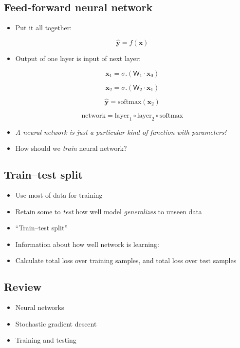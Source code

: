\hypertarget{feed-forward-neural-network}{%
\subsection{Feed-forward neural
network}\label{feed-forward-neural-network}}

\begin{itemize}
\item
  Put it all together:

  \[\hat{\mathbf{y}} = f(\mathbf{x})\]
\item
  Output of one layer is input of next layer:

  \[\mathbf{x}_1 = \sigma.(\mathsf{W}_1 \cdot \mathbf{x}_0)\]

  \[\mathbf{x}_2 = \sigma.(\mathsf{W}_2 \cdot \mathbf{x}_1)\]

  \[\hat{\mathbf{y}} = \text{softmax}(\mathbf{x}_2)\]

  \[\text{network} = \text{layer}_1 \circ \text{layer}_2 \circ \text{softmax} \]
\item
  \emph{A neural network is just a particular kind of function with
  parameters!}
\item
  How should we \emph{train} neural network?
\end{itemize}

\hypertarget{traintest-split}{%
\subsection{Train--test split}\label{traintest-split}}

\begin{itemize}
\item
  Use most of data for training
\item
  Retain some to \emph{test} how well model \emph{generalizes} to unseen
  data
\item
  ``Train--test split''
\item
  Information about how well network is learning:
\item
  Calculate total loss over training samples, and total loss over test
  samples
\end{itemize}

\hypertarget{review}{%
\subsection{Review}\label{review}}

\begin{itemize}
\item
  Neural networks
\item
  Stochastic gradient descent
\item
  Training and testing
\end{itemize}
